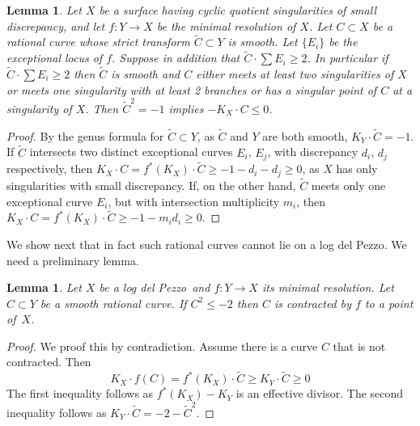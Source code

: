 \documentclass[12pt,a4paper]{book}      %
\newtheorem{lem}[thm]{Lemma}
\theoremstyle{definition}
\newcommand{\ldp}{log del Pezzo}
\newcommand{\minres}{minimal resolution}
\newcommand{\wt}[1]{\widetilde #1}
\begin{document}
\begin{lem}\label{lem!badcurve}
Let $X$ be a surface having cyclic quotient singularities of small discrepancy, and let  $f \colon Y \rightarrow X$ be the minimal resolution of $X$. Let $C \subset X$ be a rational curve whose 
strict transform $\widetilde C \subset Y$ is smooth. Let $\{ E_i \}$ be the exceptional locus of $f$. Suppose in addition that 
$\widetilde C \cdot \sum E_i \geq 2$. In particular if $\wt{C} \cdot \sum E_i \geq 2$ then $\widetilde C$ is smooth and
$C$ either meets at least two singularities of $X$ or meets one singularity
with at least 2 branches or has a singular point of $C$ at a singularity of $X$. Then $\widetilde C^2 = -1$ implies $-K_X \cdot C \leq 0$.
\end{lem}
\begin{proof}
By the genus formula for $\widetilde C\subset Y$, as $\widetilde C$ and $Y$ are both smooth,
$K_Y \cdot \widetilde C = -1$. If $\wt C$ intersects two distinct exceptional curves $E_i$, $E_j$,
with discrepancy $d_i$, $d_j$ respectively, then
 $K_X \cdot C = f^*(K_X) \cdot \widetilde C \geq -1 - d_i - d_j  \geq 0$,
 as $X$ has only singularities with small discrepancy. 
 If, on the other hand, $\wt C$ meets only one exceptional curve $E_i$, but with intersection
multiplicity $m_i$, then $K_X \cdot C = f^*(K_X) \cdot \widetilde C \geq -1 - m_id_i  \geq 0$.
\end{proof}

We show next that in fact such rational curves cannot lie on a \ldp.
We need a preliminary lemma.
\begin{lem}\label{lem!minus2curve}
Let $X$ be a \ldp\ and $f \colon Y \rightarrow X$ its \minres.
Let $C\subset Y$ be a smooth rational curve. If $C^2\le-2$ then $C$ is contracted by $f$
to a point of~$X$.
\end{lem}

\begin{proof}
We proof this by contradiction. Assume there is a curve $C$ that is not contracted. Then 
\[
K_X \cdot f(C) = f^*(K_X) \cdot \wt{C} \geq K_Y \cdot \wt{C} \geq 0
\]
The first inequality follows as $f^*(K_X) - K_Y$ is an effective divisor. The second inequality follows as $K_Y \cdot \wt{C} = -2 - \wt{C}^2$.
\end{proof}
\end{document}
